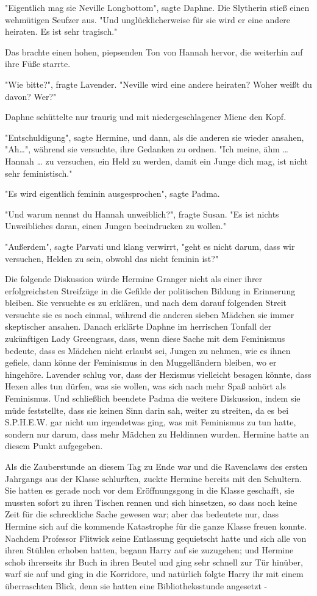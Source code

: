 {"Eigentlich mag sie Neville Longbottom", sagte Daphne. Die Slytherin stieß einen wehmütigen Seufzer aus. "Und unglücklicherweise für sie wird er eine andere heiraten. Es ist sehr tragisch."

Das brachte einen hohen, piepsenden Ton von Hannah hervor, die weiterhin auf ihre Füße starrte.

"Wie bitte?", fragte Lavender. "Neville wird eine andere heiraten? Woher weißt du davon? Wer?"

Daphne schüttelte nur traurig und mit niedergeschlagener Miene den Kopf.

"Entschuldigung", sagte Hermine, und dann, als die anderen sie wieder ansahen, "Ah…", während sie versuchte, ihre Gedanken zu ordnen. "Ich meine, ähm … Hannah … zu versuchen, ein Held zu werden, damit ein Junge dich mag, ist nicht sehr feministisch."

"Es wird eigentlich feminin ausgesprochen", sagte Padma.

"Und warum nennst du Hannah unweiblich?", fragte Susan. "Es ist nichts Unweibliches daran, einen Jungen beeindrucken zu wollen."

"Außerdem", sagte Parvati und klang verwirrt, "geht es nicht darum, dass wir versuchen, Helden zu sein, obwohl das nicht feminin ist?"

Die folgende Diskussion würde Hermine Granger nicht als einer ihrer erfolgreichsten Streifzüge in die Gefilde der politischen Bildung in Erinnerung bleiben. Sie versuchte es zu erklären, und nach dem darauf folgenden Streit versuchte sie es noch einmal, während die anderen sieben Mädchen sie immer skeptischer ansahen. Danach erklärte Daphne im herrischen Tonfall der zukünftigen Lady Greengrass, dass, wenn diese Sache mit dem Feminismus bedeute, dass es Mädchen nicht erlaubt sei, Jungen zu nehmen, wie es ihnen gefiele, dann könne der Feminismus in den Muggelländern bleiben, wo er hingehöre. Lavender schlug vor, dass der Hexismus vielleicht besagen könnte, dass Hexen alles tun dürfen, was sie wollen, was sich nach mehr Spaß anhört als Feminismus. Und schließlich beendete Padma die weitere Diskussion, indem sie müde feststellte, dass sie keinen Sinn darin sah, weiter zu streiten, da es bei S.P.H.E.W. gar nicht um irgendetwas ging, was mit Feminismus zu tun hatte, sondern nur darum, dass mehr Mädchen zu Heldinnen wurden. Hermine hatte an diesem Punkt aufgegeben.

Als die Zauberstunde an diesem Tag zu Ende war und die Ravenclaws des ersten Jahrgangs aus der Klasse schlurften, zuckte Hermine bereits mit den Schultern. Sie hatten es gerade noch vor dem Eröffnungsgong in die Klasse geschafft, sie mussten sofort zu ihren Tischen rennen und sich hinsetzen, so dass noch keine Zeit für die schreckliche Sache gewesen war; aber das bedeutete nur, dass Hermine sich auf die kommende Katastrophe für die ganze Klasse freuen konnte. Nachdem Professor Flitwick seine Entlassung gequietscht hatte und sich alle von ihren Stühlen erhoben hatten, begann Harry auf sie zuzugehen; und Hermine schob ihrerseits ihr Buch in ihren Beutel und ging sehr schnell zur Tür hinüber, warf sie auf und ging in die Korridore, und natürlich folgte Harry ihr mit einem überraschten Blick, denn sie hatten eine Bibliotheksstunde angesetzt -

}
